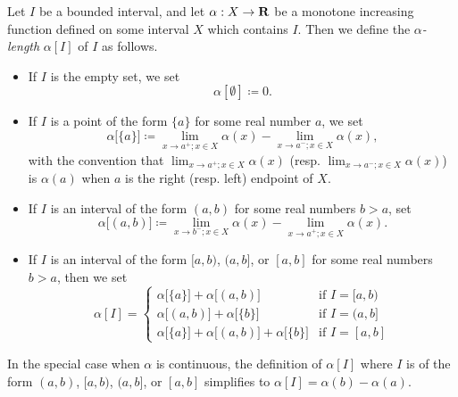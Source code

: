 \begin{definition}\label{11.8.1}
    Let \(I\) be a bounded interval, and let \(\alpha : X \to \mathbf{R}\) be a monotone increasing function defined on some interval \(X\) which contains \(I\).
    Then we define the \emph{\(\alpha\)-length} \(\alpha[I]\) of \(I\) as follows.
    \begin{itemize}
        \item If \(I\) is the empty set, we set
              \[
                  \alpha[\emptyset] \coloneqq 0.
              \]
        \item If \(I\) is a point of the form \(\{a\}\) for some real number \(a\), we set
              \[
                  \alpha\big[\{a\}\big] \coloneqq \lim_{x \to a^+ ; x \in X} \alpha(x) - \lim_{x \to a^- ; x \in X} \alpha(x),
              \]
              with the convention that \(\lim_{x \to a^+ ; x \in X} \alpha(x)\) (resp. \(\lim_{x \to a^- ; x \in X} \alpha(x)\)) is \(\alpha(a)\) when \(a\) is the right (resp. left) endpoint of \(X\).
        \item If \(I\) is an interval of the form \((a, b)\) for some real numbers \(b > a\), set
              \[
                  \alpha\big[(a, b)\big] \coloneqq \lim_{x \to b^- ; x \in X} \alpha(x) - \lim_{x \to a^+ ; x \in X} \alpha(x).
              \]
        \item If \(I\) is an interval of the form \([a, b)\), \((a, b]\), or \([a, b]\) for some real numbers \(b > a\), then we set
              \[
                  \alpha[I] = \begin{cases}
                      \alpha\big[\{a\}\big] + \alpha\big[(a, b)\big]                         & \text{if } I = [a, b) \\
                      \alpha\big[(a, b)\big] + \alpha\big[\{b\}\big]                         & \text{if } I = (a, b] \\
                      \alpha\big[\{a\}\big] + \alpha\big[(a, b)\big] + \alpha\big[\{b\}\big] & \text{if } I = [a, b]
                  \end{cases}
              \]
    \end{itemize}
\end{definition}

\begin{note}
    In the special case when \(\alpha\) is continuous, the definition of \(\alpha[I]\) where \(I\) is of the form \((a, b)\), \([a, b)\), \((a, b]\), or \([a, b]\) simplifies to \(\alpha[I] = \alpha(b) - \alpha(a)\).
\end{note}

